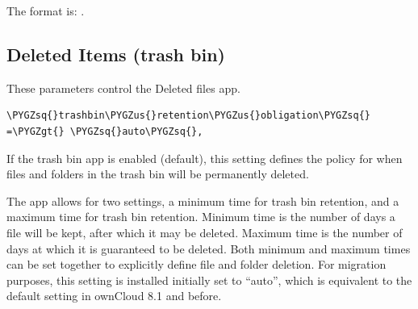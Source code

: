 \documentclass[letterpaper,10pt,english]{sphinxmanual}
\def\PYGZus{\char`\_}
\def\PYGZgt{\char`\>}
\def\PYGZsq{\char`\'}
\begin{document}
The format is: .


\subsection{Deleted Items (trash bin)}
\label{configuration_server/config_sample_php_parameters:deleted-items-trash-bin}
These parameters control the Deleted files app.

\begin{Verbatim}[commandchars=\\\{\}]
\PYGZsq{}trashbin\PYGZus{}retention\PYGZus{}obligation\PYGZsq{} =\PYGZgt{} \PYGZsq{}auto\PYGZsq{},
\end{Verbatim}

If the trash bin app is enabled (default), this setting defines the policy
for when files and folders in the trash bin will be permanently deleted.

The app allows for two settings, a minimum time for trash bin retention,
and a maximum time for trash bin retention.
Minimum time is the number of days a file will be kept, after which it
may be deleted. Maximum time is the number of days at which it is guaranteed
to be deleted.
Both minimum and maximum times can be set together to explicitly define
file and folder deletion. For migration purposes, this setting is installed
initially set to ``auto'', which is equivalent to the default setting in
ownCloud 8.1 and before.
\end{document}
